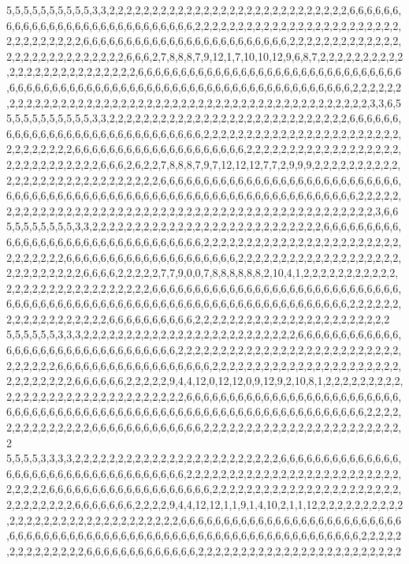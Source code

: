 5,5,5,5,5,5,5,5,5,5,3,3,2,2,2,2,2,2,2,2,2,2,2,2,2,2,2,2,2,2,2,2,2,2,2,2,2,2,2,2,6,6,6,6,6,6,6,6,6,6,6,6,6,6,6,6,6,6,6,6,6,6,6,6,6,6,6,6,2,2,2,2,2,2,2,2,2,2,2,2,2,2,2,2,2,2,2,2,2,2,2,2,2,2,2,2,2,2,2,2,2,6,6,6,6,6,6,6,6,6,6,6,6,6,6,6,6,6,6,6,6,6,6,6,6,2,2,2,2,2,2,2,2,2,2,2,2,2,2,2,2,2,2,2,2,2,2,2,2,2,2,2,6,6,6,2,7,8,8,8,7,9,12,1,7,10,10,12,9,6,8,7,2,2,2,2,2,2,2,2,2,2,2,2,2,2,2,2,2,2,2,2,2,2,2,2,2,6,6,6,6,6,6,6,6,6,6,6,6,6,6,6,6,6,6,6,6,6,6,6,6,6,6,6,6,6,6,6,6,6,6,6,6,6,6,6,6,6,6,6,6,6,6,6,6,6,6,6,6,6,6,6,6,6,6,6,6,6,6,6,6,6,6,6,6,6,6,6,2,2,2,2,2,2,2,2,2,2,2,2,2,2,2,2,2,2,2,2,2,2,2,2,2,2,2,2,2,2,2,2,2,2,2,2,2,2,2,2,2,2,2,2,2,2,2,2,3,3,6,5
5,5,5,5,5,5,5,5,5,5,3,3,2,2,2,2,2,2,2,2,2,2,2,2,2,2,2,2,2,2,2,2,2,2,2,2,2,2,2,2,6,6,6,6,6,6,6,6,6,6,6,6,6,6,6,6,6,6,6,6,6,6,6,6,6,6,6,6,6,2,2,2,2,2,2,2,2,2,2,2,2,2,2,2,2,2,2,2,2,2,2,2,2,2,2,2,2,2,2,2,6,6,6,6,6,6,6,6,6,6,6,6,6,6,6,6,6,6,6,6,2,2,2,2,2,2,2,2,2,2,2,2,2,2,2,2,2,2,2,2,2,2,2,2,2,2,2,2,2,6,6,6,2,6,2,2,7,8,8,8,7,9,7,12,12,12,7,7,2,9,9,9,2,2,2,2,2,2,2,2,2,2,2,2,2,2,2,2,2,2,2,2,2,2,2,2,2,2,2,2,6,6,6,6,6,6,6,6,6,6,6,6,6,6,6,6,6,6,6,6,6,6,6,6,6,6,6,6,6,6,6,6,6,6,6,6,6,6,6,6,6,6,6,6,6,6,6,6,6,6,6,6,6,6,6,6,6,6,6,6,6,6,6,6,6,6,6,6,6,2,2,2,2,2,2,2,2,2,2,2,2,2,2,2,2,2,2,2,2,2,2,2,2,2,2,2,2,2,2,2,2,2,2,2,2,2,2,2,2,2,2,2,2,2,2,2,2,3,6,6
5,5,5,5,5,5,5,5,3,3,2,2,2,2,2,2,2,2,2,2,2,2,2,2,2,2,2,2,2,2,2,2,2,2,2,2,2,6,6,6,6,6,6,6,6,6,6,6,6,6,6,6,6,6,6,6,6,6,6,6,6,6,6,6,6,6,6,6,6,2,2,2,2,2,2,2,2,2,2,2,2,2,2,2,2,2,2,2,2,2,2,2,2,2,2,2,2,2,2,6,6,6,6,6,6,6,6,6,6,6,6,6,6,6,6,6,6,6,6,2,2,2,2,2,2,2,2,2,2,2,2,2,2,2,2,2,2,2,2,2,2,2,2,2,2,2,2,6,6,6,6,2,2,2,2,2,7,7,9,0,0,7,8,8,8,8,8,8,2,10,4,1,2,2,2,2,2,2,2,2,2,2,2,2,2,2,2,2,2,2,2,2,2,2,2,2,2,2,2,2,6,6,6,6,6,6,6,6,6,6,6,6,6,6,6,6,6,6,6,6,6,6,6,6,6,6,6,6,6,6,6,6,6,6,6,6,6,6,6,6,6,6,6,6,6,6,6,6,6,6,6,6,6,6,6,6,6,6,6,6,6,6,6,6,6,6,6,6,6,2,2,2,2,2,2,2,2,2,2,2,2,2,2,2,2,2,2,6,6,6,6,6,6,6,6,6,6,2,2,2,2,2,2,2,2,2,2,2,2,2,2,2,2,2,2,2,2,2,2,2
5,5,5,5,5,5,3,3,3,2,2,2,2,2,2,2,2,2,2,2,2,2,2,2,2,2,2,2,2,2,2,2,2,2,6,6,6,6,6,6,6,6,6,6,6,6,6,6,6,6,6,6,6,6,6,6,6,6,6,6,6,6,6,6,6,6,2,2,2,2,2,2,2,2,2,2,2,2,2,2,2,2,2,2,2,2,2,2,2,2,2,2,2,2,2,2,2,2,6,6,6,6,6,6,6,6,6,6,6,6,6,6,6,6,6,6,2,2,2,2,2,2,2,2,2,2,2,2,2,2,2,2,2,2,2,2,2,2,2,2,2,2,2,2,2,2,6,6,6,6,6,6,2,2,2,2,2,9,4,4,12,0,12,12,0,9,12,9,2,10,8,1,2,2,2,2,2,2,2,2,2,2,2,2,2,2,2,2,2,2,2,2,2,2,2,2,2,2,2,2,2,2,6,6,6,6,6,6,6,6,6,6,6,6,6,6,6,6,6,6,6,6,6,6,6,6,6,6,6,6,6,6,6,6,6,6,6,6,6,6,6,6,6,6,6,6,6,6,6,6,6,6,6,6,6,6,6,6,6,6,6,6,6,6,6,6,6,6,6,2,2,2,2,2,2,2,2,2,2,2,2,2,2,6,6,6,6,6,6,6,6,6,6,6,6,6,2,2,2,2,2,2,2,2,2,2,2,2,2,2,2,2,2,2,2,2,2,2,2,2
5,5,5,5,3,3,3,3,2,2,2,2,2,2,2,2,2,2,2,2,2,2,2,2,2,2,2,2,2,2,2,2,6,6,6,6,6,6,6,6,6,6,6,6,6,6,6,6,6,6,6,6,6,6,6,6,6,6,6,6,6,6,6,6,6,6,6,2,2,2,2,2,2,2,2,2,2,2,2,2,2,2,2,2,2,2,2,2,2,2,2,2,2,2,2,2,2,6,6,6,6,6,6,6,6,6,6,6,6,6,6,6,6,6,6,6,2,2,2,2,2,2,2,2,2,2,2,2,2,2,2,2,2,2,2,2,2,2,2,2,2,2,2,2,2,2,6,6,6,6,6,6,6,2,2,2,2,9,4,4,12,12,1,1,9,1,4,10,2,1,1,12,2,2,2,2,2,2,2,2,2,2,2,2,2,2,2,2,2,2,2,2,2,2,2,2,2,2,2,2,2,2,6,6,6,6,6,6,6,6,6,6,6,6,6,6,6,6,6,6,6,6,6,6,6,6,6,6,6,6,6,6,6,6,6,6,6,6,6,6,6,6,6,6,6,6,6,6,6,6,6,6,6,6,6,6,6,6,6,6,6,6,6,6,6,6,6,6,6,2,2,2,2,2,2,2,2,2,2,2,2,2,2,6,6,6,6,6,6,6,6,6,6,6,6,6,2,2,2,2,2,2,2,2,2,2,2,2,2,2,2,2,2,2,2,2,2,2,2,2

